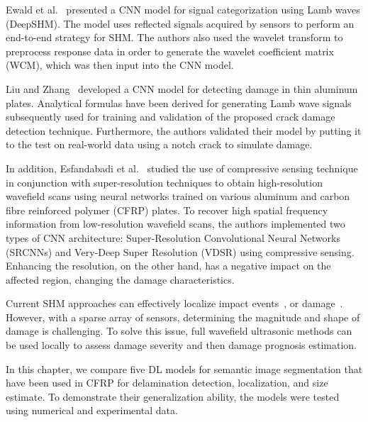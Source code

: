 Ewald et al.~\cite{Ewald2019b} presented a CNN model for signal categorization using Lamb waves (DeepSHM).
The model uses reflected signals acquired by sensors to perform an end-to-end strategy for SHM.
The authors also used the wavelet transform to preprocess response data in order to generate the wavelet coefficient matrix (WCM), which was then input into the CNN model.

Liu and Zhang~\cite{Liu2020a} developed a CNN model for detecting damage in thin aluminum plates.
Analytical formulas have been derived for generating Lamb wave signals subsequently used for training and validation of the proposed crack damage detection technique.
Furthermore, the authors validated their model by putting it to the test on real-world data using a notch crack to simulate damage.

In addition, Esfandabadi et al.~\cite{esfandabadideep} studied the use of compressive sensing technique~\cite{Candes2006} in conjunction with super-resolution techniques to obtain high-resolution wavefield scans using neural networks trained on various aluminum and carbon fibre reinforced polymer (CFRP) plates.
To recover high spatial frequency information from low-resolution wavefield scans, the authors implemented two types of CNN architecture: Super-Resolution Convolutional Neural Networks (SRCNNs) and Very-Deep Super Resolution (VDSR) using compressive sensing.
Enhancing the resolution, on the other hand, has a negative impact on the affected region, changing the damage characteristics.

Current SHM approaches can effectively localize impact events~\cite{Ciampa2012}, or damage~\cite{Nokhbatolfoghahai2020}.
However, with a sparse array of sensors, determining the magnitude and shape of damage is challenging.
To solve this issue, full wavefield ultrasonic methods can be used locally to assess damage severity and then damage prognosis estimation.

In this chapter, we compare five DL models for semantic image segmentation that have been used in CFRP for delamination detection, localization, and size estimate.
To demonstrate their generalization ability, the models were tested using numerical and experimental data.
